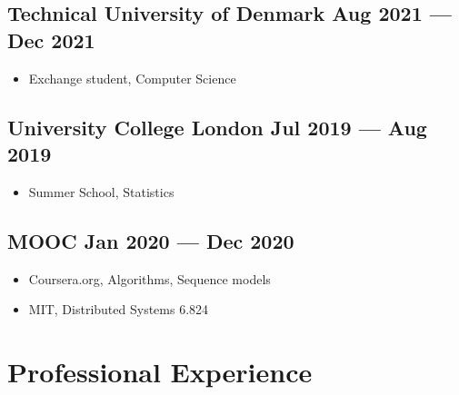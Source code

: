 \documentclass[a4,12pt]{article}
\newcommand{\subtext}[1]{
#1\par\vspace{-0.2cm}}
\newenvironment{zitemize}{
\begin{itemize}\itemsep0pt \parskip0pt \parsep1pt}
{\end{itemize}\vspace{-0.5cm}}
\begin{document}
\subsection*{Technical University of Denmark \hfill \textbf{Aug 2021 --- Dec 2021}}
\begin{zitemize}
    \item
        \subtext{Exchange student, Computer Science}
        \vspace{0.15cm}
\end{zitemize}

\subsection*{University College London \hfill \textbf{Jul 2019 --- Aug 2019}}
\begin{zitemize}
    \item
        \subtext{Summer School, Statistics}
        \vspace{0.15cm}
\end{zitemize}

\subsection*{MOOC \hfill \textbf{Jan 2020 --- Dec 2020}}
\begin{zitemize}
    \item
        \subtext{Coursera.org, Algorithms, Sequence models }
        \vspace{0.15cm}
    \item
        \subtext{MIT, Distributed Systems 6.824}
        \vspace{0.15cm}
\end{zitemize}
\vspace{0.2cm}





\section{\textbf{Professional Experience}}

        
\end{document}
